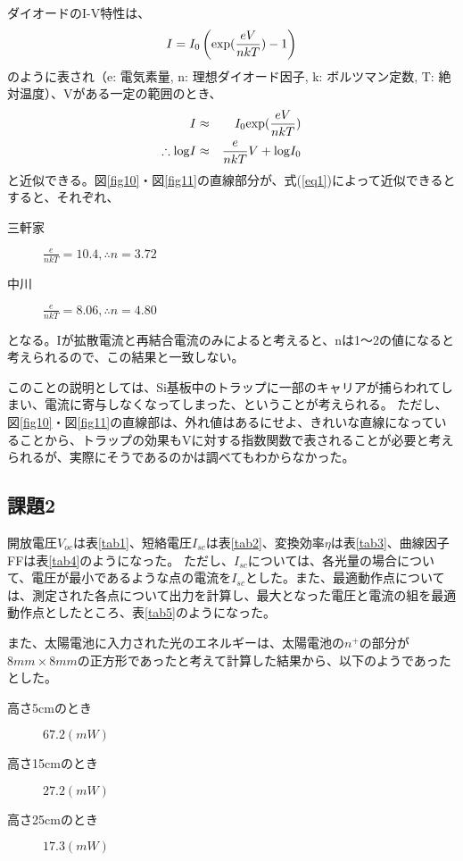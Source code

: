 \documentclass[11pt]{ltjsarticle}
\newcommand{\fr}[1]{図\ref{#1}}
\newcommand{\tr}[1]{表\ref{#1}}
\begin{document}
		ダイオードのI-V特性は、
		\begin{eqnarray}
			I = I_0 \left( {\rm exp}(\frac{eV}{nkT}) - 1 \right) \label{eq2}
		\end{eqnarray}
		のように表され（e: 電気素量, n: 理想ダイオード因子, k: ボルツマン定数, T: 絶対温度）、Vがある一定の範囲のとき、
		\begin{eqnarray}
			I & \approx & I_0 {\rm exp}(\frac{eV}{nkT}) \nonumber \\
			\therefore {\rm log} I & \approx & \frac{e}{nkT}V + {\rm log} I_0 \label{eq1}
		\end{eqnarray}
		と近似できる。\fr{fig10}・\fr{fig11}の直線部分が、式(\ref{eq1})によって近似できるとすると、それぞれ、
		\begin{description}
			\item[三軒家] $ \frac{e}{nkT} = 10.4, \therefore n = 3.72 $
			\item[中川] $ \frac{e}{nkT} = 8.06, \therefore n = 4.80 $
		\end{description}
		となる。Iが拡散電流と再結合電流のみによると考えると、nは1〜2の値になると考えられるので、この結果と一致しない。
		
		このことの説明としては、Si基板中のトラップに一部のキャリアが捕らわれてしまい、電流に寄与しなくなってしまった、ということが考えられる。
		ただし、\fr{fig10}・\fr{fig11}の直線部は、外れ値はあるにせよ、きれいな直線になっていることから、トラップの効果もVに対する指数関数で表されることが必要と考えられるが、実際にそうであるのかは調べてもわからなかった。
		
	\subsection{課題2}
		開放電圧$V_{oc}$は\tr{tab1}、短絡電圧$I_{sc}$は\tr{tab2}、変換効率$\eta$は\tr{tab3}、曲線因子FFは\tr{tab4}のようになった。
		ただし、$I_{sc}$については、各光量の場合について、電圧が最小であるような点の電流を$I_{sc}$とした。また、最適動作点については、測定された各点について出力を計算し、最大となった電圧と電流の組を最適動作点としたところ、\tr{tab5}のようになった。
	
		また、太陽電池に入力された光のエネルギーは、太陽電池の$n^+$の部分が$8mm \times 8mm$の正方形であったと考えて計算した結果から、以下のようであったとした。
		\begin{description}
			\item[高さ5cmのとき]  $67.2 (mW)$
			\item[高さ15cmのとき] $27.2 (mW)$
			\item[高さ25cmのとき] $17.3 (mW)$
		\end{description}
		
\end{document}
